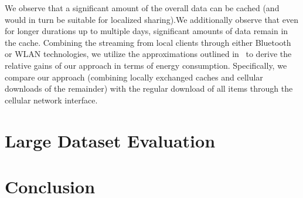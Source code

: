 \documentclass[letterpaper,conference]{IEEEtran}
\begin{document}
We observe that a significant amount of the overall data can be cached (and would in turn be suitable for localized sharing).We additionally observe that even for longer durations up to multiple days, significant amounts of data remain in the cache.
Combining the streaming from local clients through either Bluetooth or WLAN technologies, we utilize the approximations outlined in~\cite{} to derive the relative gains of our approach in terms of energy consumption. 
Specifically, we compare our approach (combining locally exchanged caches and cellular downloads of the remainder) with the regular download of all items through the cellular network interface. 






\section{Large Dataset Evaluation}

\section{Conclusion}
\end{document}
